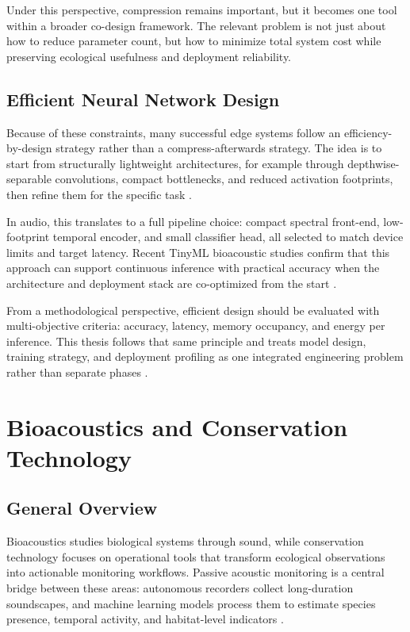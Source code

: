 \documentclass[a4paper,singleside,12pt]{report} %
\begin{document}
Under this perspective, compression remains important, but it becomes one tool within a broader co-design framework. The relevant problem is not just about how to reduce parameter count, but how to minimize total system cost while preserving ecological usefulness and deployment reliability.

	\subsection{Efficient Neural Network Design}
		\begin{sloppypar}
		Because of these constraints, many successful edge systems follow an efficiency-by-design strategy rather than a compress-afterwards strategy. The idea is to start from structurally lightweight architectures, for example through depthwise-separable convolutions, compact bottlenecks, and reduced activation footprints, then refine them for the specific task \cite{mobilenetv2,matchboxnet2020,phinets2022}.
		\end{sloppypar}

	In audio, this translates to a full pipeline choice: compact spectral front-end, low-footprint temporal encoder, and small classifier head, all selected to match device limits and target latency. Recent TinyML bioacoustic studies confirm that this approach can support continuous inference with practical accuracy when the architecture and deployment stack are co-optimized from the start \cite{sabbella2022alwayson,tinychirp2024,paissan2022scalableaudio}.

	From a methodological perspective, efficient design should be evaluated with multi-objective criteria: accuracy, latency, memory occupancy, and energy per inference. This thesis follows that same principle and treats model design, training strategy, and deployment profiling as one integrated engineering problem rather than separate phases \cite{abadade2023tinymlsurvey,singh2023edgeaisurvey}.

	\section{Bioacoustics and Conservation Technology}
	\subsection{General Overview}
Bioacoustics studies biological systems through sound, while conservation technology focuses on operational tools that transform ecological observations into actionable monitoring workflows. Passive acoustic monitoring is a central bridge between these areas: autonomous recorders collect long-duration soundscapes, and machine learning models process them to estimate species presence, temporal activity, and habitat-level indicators \cite{nietomora2023systematic,birdnet2021}.
\end{document}
